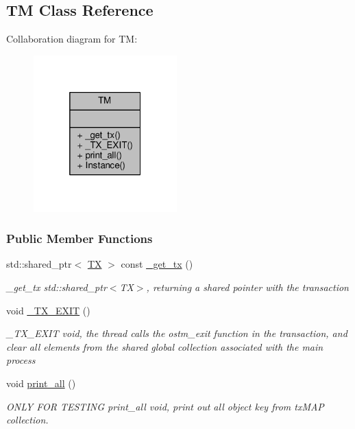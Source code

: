 \hypertarget{class_t_m}{}\subsection{TM Class Reference}
\label{class_t_m}


Collaboration diagram for TM\+:\nopagebreak
\begin{figure}[H]
\begin{center}
\leavevmode
\includegraphics[width=157pt]{class_t_m__coll__graph}
\end{center}
\end{figure}
\subsubsection*{Public Member Functions}
\begin{DoxyCompactItemize}
\item 
std\+::shared\+\_\+ptr$<$ \hyperlink{class_t_x}{TX} $>$ const \hyperlink{class_t_m_a41cb0226cc4080c931651b13f74a0075}{\+\_\+get\+\_\+tx} ()
\begin{DoxyCompactList}\small\item\em \+\_\+get\+\_\+tx std\+::shared\+\_\+ptr$<$\+T\+X$>$, returning a shared pointer with the transaction \end{DoxyCompactList}\item 
void \hyperlink{class_t_m_a5e2d1127f2429f2f524d25f430eade06}{\+\_\+\+T\+X\+\_\+\+E\+X\+IT} ()
\begin{DoxyCompactList}\small\item\em \+\_\+\+T\+X\+\_\+\+E\+X\+IT void, the thread calls the ostm\+\_\+exit function in the transaction, and clear all elements from the shared global collection associated with the main process \end{DoxyCompactList}\item 
void \hyperlink{class_t_m_a1d6891b1d3e71cc0acef54e7afe71c09}{print\+\_\+all} ()
\begin{DoxyCompactList}\small\item\em O\+N\+LY F\+OR T\+E\+S\+T\+I\+NG print\+\_\+all void, print out all object key from tx\+M\+AP collection. \end{DoxyCompactList}\end{DoxyCompactItemize}
